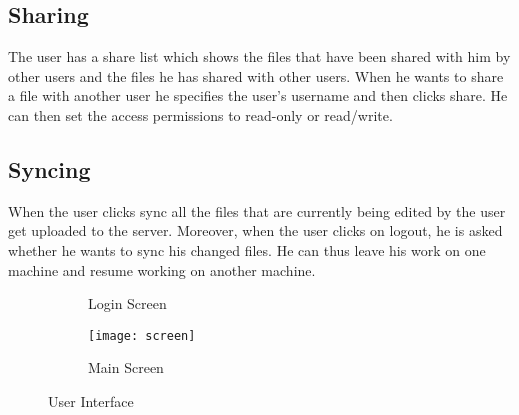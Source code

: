 \documentclass[]{article}
\begin{document}
\subsection{Sharing}The user has a share list which shows the files that have been shared with him by other users and the files he has shared with other users. When he wants to share a file with another user he specifies the user's username and then clicks share. He can then set the access permissions to read-only or read/write.
\subsection{Syncing}When the user clicks sync all the files that are currently being edited by the user get uploaded to the server. Moreover, when the user clicks on logout, he is asked whether he wants to sync his changed files. He can thus leave his work on one machine and resume working on another machine.
\begin{figure}
\hspace*{-1.2in}
\begin{subfigure}{.5\textwidth}
 \noindent{}
  \caption{Login Screen}
  \label{fig:sub1}
\end{subfigure}%
\begin{subfigure}{.5\textwidth}
  \centering
  \texttt{[image: screen]}
  \caption{Main Screen}
  \label{fig:sub2}
\end{subfigure}
\caption{User Interface}
\label{fig:test}
\end{figure}
\end{document}
